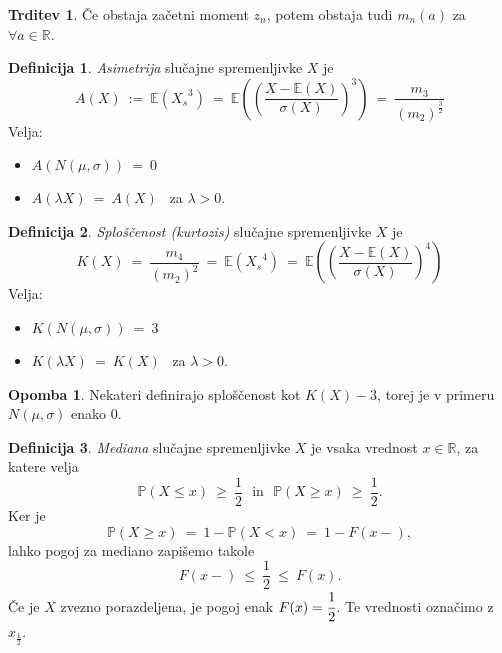\documentclass[11pt]{article}
\theoremstyle{definition}
\newtheorem{definicija}{Definicija}[section]
\theoremstyle{definition}
\newtheorem{trditev}{Trditev}[section]
\theoremstyle{definition}
\newtheorem*{opomba}{Opomba}
\begin{document}
\begin{trditev}

Če obstaja začetni moment $z_n$, potem obstaja tudi $m_n(a)$ za $\forall a \in \mathbb{R}$.

\end{trditev}
\vspace{0.5cm}

\begin{definicija}

\textit{Asimetrija} slučajne spremenljivke $X$ je 
$$A(X) ~:=~ \mathbb{E}({X_s}^3) ~=~ \mathbb{E}\left( \left( \frac{X - \mathbb{E}(X)}{\sigma(X)} \right)^3 \right) ~=~ \frac{m_3}{(m_2)^{\frac{3}{2}}}$$
Velja:
\begin{itemize}
	\item $A(N(\mu, \sigma)) ~=~ 0$
	\item $A(\lambda X) ~=~ A(X)$ ~za $\lambda > 0$.
\end{itemize}

\end{definicija}
\vspace{0.5cm}

\begin{definicija}

\textit{Sploščenost (kurtozis)} slučajne spremenljivke $X$ je
$$K(X) ~=~ \frac{m_4}{(m_2)^2} ~=~ \mathbb{E}({X_s}^4) ~=~ \mathbb{E}\left( \left( \frac{X - \mathbb{E}(X)}{\sigma(X)} \right)^4 \right)$$
Velja:
\begin{itemize}
	\item $K(N(\mu, \sigma)) ~=~ 3$
	\item $K(\lambda X) ~=~ K(X)$ ~za $\lambda > 0$.
\end{itemize}

\end{definicija}
\vspace{0.5cm}

\begin{opomba}

Nekateri definirajo sploščenost kot $K(X) - 3$, torej je v primeru $N(\mu, \sigma)$ enako $0$.

\end{opomba}
\vspace{0.5cm}

\begin{definicija}

\textit{Mediana}  slučajne spremenljivke $X$ je vsaka vrednost $x \in \mathbb{R}$, za katere velja
$$\mathbb{P}(X \leq x) ~\geq~ \frac{1}{2} ~~~\text{in}~~~ \mathbb{P}(X \geq x) ~\geq~ \frac{1}{2}.$$
Ker je 
$$\mathbb{P}(X \geq x) ~=~ 1 - \mathbb{P}(X < x) ~=~ 1 - F(x-),$$
lahko pogoj za mediano zapišemo takole
$$F(x-) ~\leq~ \frac{1}{2} ~\leq~ F(x).$$
Če je $X$ zvezno porazdeljena, je pogoj enak $F(x) = \cfrac{1}{2}$. Te vrednosti označimo z $x_{\frac{1}{2}}$.

\end{definicija}
\vspace{0.5cm}
\end{document}
